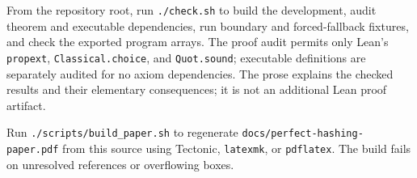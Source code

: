 \documentclass[11pt,a4paper]{article}
\theoremstyle{definition}
\newcommand{\code}[1]{\nolinkurl{#1}}
\begin{document}
From the repository root, run \code{./check.sh} to build the development,
audit theorem and executable dependencies, run boundary and forced-fallback
fixtures, and check the exported program arrays. The proof audit permits
only Lean's \code{propext}, \code{Classical.choice}, and \code{Quot.sound};
executable definitions are separately audited for no axiom dependencies.
The prose explains the checked results and their elementary consequences;
it is not an additional Lean proof artifact.

Run \code{./scripts/build_paper.sh} to regenerate
\code{docs/perfect-hashing-paper.pdf} from this source using Tectonic,
\code{latexmk}, or \code{pdflatex}. The build fails on unresolved references
or overflowing boxes.
\end{document}
